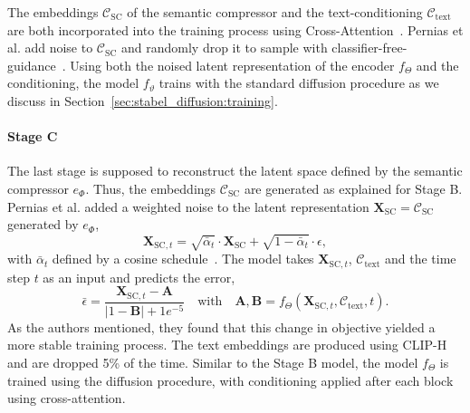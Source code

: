 The embeddings $\mathcal{C}_{\text{SC}}$ of the semantic compressor and the
text-conditioning $\mathcal{C}_{\text{text}}$ are both incorporated into the training process using Cross-Attention~\cite{vaswani2023attentionneed}.
Pernias et al. add noise to $\mathcal{C}_{\text{SC}}$ and randomly drop it to
sample with classifier-free-guidance~\cite{ho2022classifierfreediffusionguidance}.
Using both the noised latent representation of the encoder $f_\Theta$ and the
conditioning, the model $f_\vartheta$ trains with the standard diffusion
procedure as we discuss in Section~\ref{sec:stabel_diffusion:training}.

\paragraph*{Stage C} The last stage is supposed to reconstruct the latent space
defined by the semantic compressor $e_\Phi$. Thus, the embeddings
$\mathcal{C}_{\text{SC}}$ are generated as explained for Stage B. Pernias et
al. added a weighted noise to the latent representation
$\boldsymbol{X}_{\text{SC}} = \mathcal{C}_{\text{SC}}$ generated by $e_\Phi$,
\begin{equation*}
    \boldsymbol{X}_{\text{SC}, t} = \sqrt{\bar{\alpha}_t}\cdot\boldsymbol{X}_{\text{SC}}+\sqrt{1-\bar{\alpha}_t}\cdot\epsilon,
\end{equation*}
with $\bar{\alpha}_t$ defined by a cosine schedule~\cite{Nichol2021ImprovedDenoisingDiffusionProbabilisticModels}.
The model takes $\boldsymbol{X}_{\text{SC}, t}$, $\mathcal{C}_{\text{text}}$ and
the time step $t$ as an input and predicts the error,
\begin{equation*}
    \bar{\epsilon} = \frac{\boldsymbol{X}_{\text{SC}, t} - \boldsymbol{A}}{|1-\boldsymbol{B}| + 1e^{-5}} \quad \text{with} \quad \boldsymbol{A}, \boldsymbol{B} = f_\Theta(\boldsymbol{X}_{\text{SC}, t},\mathcal{C}_{\text{text}}, t).
\end{equation*}
As the authors mentioned, they found that this change in objective yielded a more
stable training process. The text embeddings are produced using
CLIP-H~\cite{Ilharco2021OpenCLIP} and are dropped 5\% of the time. Similar to
the Stage B model, the model $f_\Theta$ is trained using the diffusion
procedure, with conditioning applied after each block using cross-attention.
